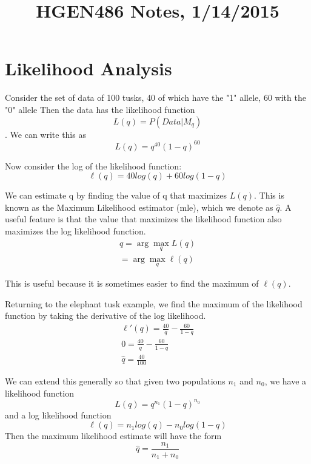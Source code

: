 \documentclass[10pt,a4paper]{article}
\title{HGEN486 Notes, 1/14/2015}
\begin{document}
\maketitle 
\section{Likelihood Analysis}
Consider the set of data of 100 tusks, 40 of which have the "1" allele, 60 with the "0" allele
Then the data has the likelihood function \begin{equation} L(q) = P(Data|M_q)\end{equation}. We can write this as \begin{equation} L(q) = q^{40}(1-q)^{60}\end{equation}

Now consider the log of the likelihood function: \begin{equation} \ell(q) = 40log(q) + 60 log(1-q)\end{equation}

We can estimate q by finding the value of q that maximizes $L(q)$. This is known as the Maximum Likelihood estimator (mle), which we denote as $\hat{q}$. A useful feature is that the value that maximizes the likelihood function also maximizes the log likelihood function.
\newcommand{\argmax}{\arg\!\max}
\begin{equation}
\begin{aligned} \hat{q} = \argmax_q L(q) \\
= \argmax_q \ell(q)
\end{aligned} 
 \end{equation}

This is useful because it is sometimes easier to find the maximum of $\ell(q)$.

Returning to the elephant tusk example, we find the maximum of the likelihood function by taking the derivative of the log likelihood.
\begin{equation}
\begin{aligned}
\ell'(q) = \frac{40}{q} - \frac{60}{1-q}\\
0 = \frac{40}{q} - \frac{60}{1-q} \\
\hat{q} = \frac{40}{100}
\end{aligned}
\end{equation}

We can extend this generally so that given two populations $n_1$ and $n_0$, we have a likelihood function \begin{equation}
L(q) = q^{n_1}(1-q)^{n_0}
\end{equation}
and a log likelihood function \begin{equation}
\ell(q) = n_1log(q) - n_0log(1-q)
\end{equation}
Then the maximum likelihood estimate will have the form \begin{equation}
\hat{q} = \frac{n_1}{n_1+n_0}
\end{equation}
\end{document}
